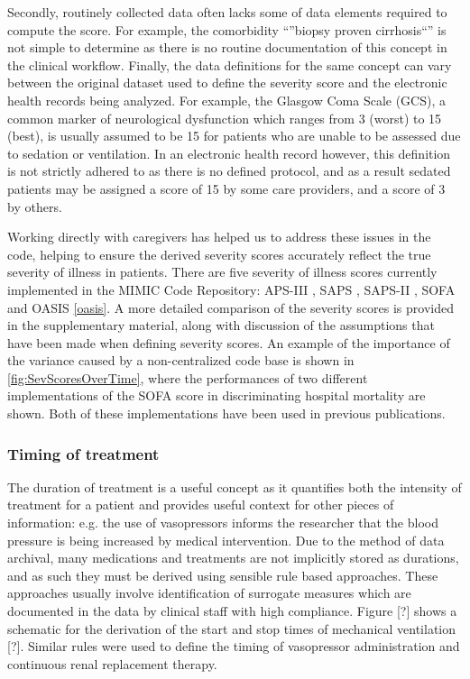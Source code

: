 \documentclass{elsart}
\begin{document}
Secondly, routinely collected data often lacks some of data elements required to compute the score. For example, the comorbidity ``''biopsy proven cirrhosis``'' is not simple to determine as there is no routine documentation of this concept in the clinical workflow. Finally, the data definitions for the same concept can vary between the original dataset used to define the severity score and the electronic health records being analyzed. For example, the Glasgow Coma Scale (GCS), a common marker of neurological dysfunction which ranges from 3 (worst) to 15 (best), is usually assumed to be 15 for patients who are unable to be assessed due to sedation or ventilation. In an electronic health record however, this definition is not strictly adhered to as there is no defined protocol, and as a result sedated patients may be assigned a score of 15 by some care providers, and a score of 3 by others.

Working directly with caregivers has helped us to address these issues in the code, helping to ensure the derived severity scores accurately reflect the true severity of illness in patients. There are five severity of illness scores currently implemented in the MIMIC Code Repository: APS-III \cite{aps}, SAPS \cite{saps}, SAPS-II \cite{sapsii}, SOFA \cite{sofa} and OASIS \ref{oasis}. A more detailed comparison of the severity scores is provided in the supplementary material, along with discussion of the assumptions that have been made when defining severity scores. An example of the importance of the variance caused by a non-centralized code base is shown in \ref{fig:SevScoresOverTime}, where the performances of two different implementations of the SOFA score in discriminating hospital mortality are shown. Both of these implementations have been used in previous publications.



\subsubsection{Timing of treatment}

The duration of treatment is a useful concept as it quantifies both the intensity of treatment for a patient and provides useful context for other pieces of information: e.g. the use of vasopressors informs the researcher that the blood pressure is being increased by medical intervention. Due to the method of data archival, many medications and treatments are not implicitly stored as durations, and as such they must be derived using sensible rule based approaches. These approaches usually involve identification of surrogate measures which are documented in the data by clinical staff with high compliance. Figure [?] shows a schematic for the derivation of the start and stop times of mechanical ventilation [?]. Similar rules were used to define the timing of vasopressor administration and continuous renal replacement therapy.
\end{document}

